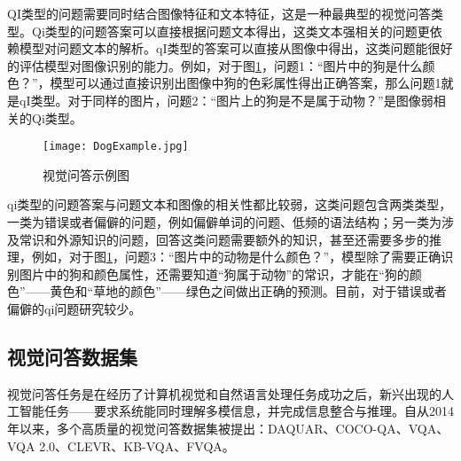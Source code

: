 QI类型的问题需要同时结合图像特征和文本特征，这是一种最典型的视觉问答类型。Qi类型的问题答案可以直接根据问题文本得出，这类文本强相关的问题更依赖模型对问题文本的解析。qI类型的答案可以直接从图像中得出，这类问题能很好的评估模型对图像识别的能力。例如，对于图\ref{DogExample}，问题1：“图片中的狗是什么颜色？”，模型可以通过直接识别出图像中狗的色彩属性得出正确答案，那么问题1就是qI类型。对于同样的图片，问题2：“图片上的狗是不是属于动物？”是图像弱相关的Qi类型。
\begin{figure}[H]
	\texttt{[image: DogExample.jpg]}
	\caption{视觉问答示例图}
	\label{DogExample}
\end{figure}

qi类型的问题答案与问题文本和图像的相关性都比较弱，这类问题包含两类类型，一类为错误或者偏僻的问题，例如偏僻单词的问题、低频的语法结构；另一类为涉及常识和外源知识的问题，回答这类问题需要额外的知识，甚至还需要多步的推理，例如，对于图\ref{DogExample}，问题3：“图片中的动物是什么颜色？”，模型除了需要正确识别图片中的狗和颜色属性，还需要知道“狗属于动物”的常识，才能在“狗的颜色”——黄色和“草地的颜色”——绿色之间做出正确的预测。目前，对于错误或者偏僻的qi问题研究较少。

\subsection{视觉问答数据集}
视觉问答任务是在经历了计算机视觉和自然语言处理任务成功之后，新兴出现的人工智能任务——要求系统能同时理解多模信息，并完成信息整合与推理。自从2014年以来，多个高质量的视觉问答数据集被提出：DAQUAR、COCO-QA、VQA、VQA 2.0、CLEVR、KB-VQA、FVQA。

